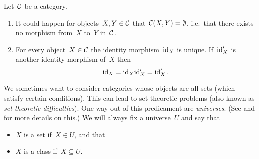 \begin{remark}
  Let~$\mathcal{C}$ be a category.
  \begin{enumerate}
    \item
      It could happen for objects~$X, Y \in \mathcal{C}$ that~$\mathcal{C}(X,Y) = \emptyset$, i.e.\ that there exists no morphism from~$X$ to~$Y$ in~$\mathcal{C}$.
    \item
      For every object~$X \in \mathcal{C}$ the identity morphism~$\mathrm{id}_X$ is unique.
      If~$\mathrm{id}'_X$ is another identity morphism of~$X$ then
      \[
          \mathrm{id}_X
        = \mathrm{id}_X \mathrm{id}'_X
        = \mathrm{id}'_X \,.
      \]
  \end{enumerate}
\end{remark}


\begin{remark}
  We sometimes want to consider categories whose objects are all sets (which satisfy certain conditions).
  This can lead to set theoretic problems (also known as \emph{set theoretic difficulties}).
  One way out of this predicament are \emph{universes}.
  (See \cite[I.6]{Working} and \cite[3.2]{Schubert} for more details on this.)
  We will always fix a universe~$U$ and say that
  \begin{itemize}
    \item
      $X$ is a set if~$X \in U$, and that
    \item
      $X$ is a class if~$X \subseteq U$.
  \end{itemize}
\end{remark}









